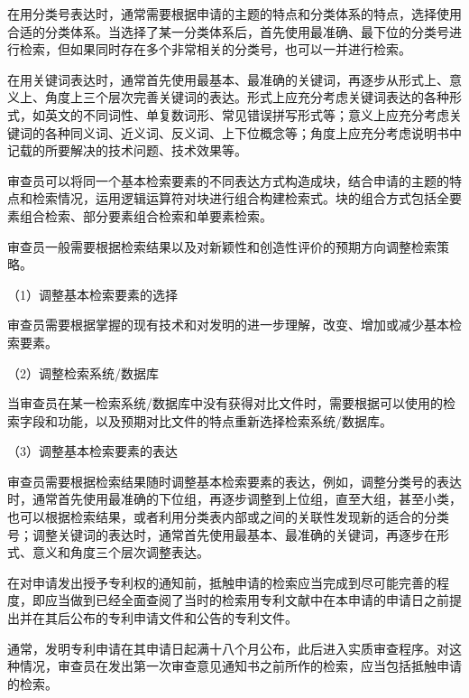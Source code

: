 在用分类号表达时，通常需要根据申请的主题的特点和分类体系的特点，选择使用合适的分类体系。当选择了某一分类体系后，首先使用最准确、最下位的分类号进行检索，但如果同时存在多个非常相关的分类号，也可以一并进行检索。

在用关键词表达时，通常首先使用最基本、最准确的关键词，再逐步从形式上、意义上、角度上三个层次完善关键词的表达。形式上应充分考虑关键词表达的各种形式，如英文的不同词性、单复数词形、常见错误拼写形式等；意义上应充分考虑关键词的各种同义词、近义词、反义词、上下位概念等；角度上应充分考虑说明书中记载的所要解决的技术问题、技术效果等。

审查员可以将同一个基本检索要素的不同表达方式构造成块，结合申请的主题的特点和检索情况，运用逻辑运算符对块进行组合构建检索式。块的组合方式包括全要素组合检索、部分要素组合检索和单要素检索。

审查员一般需要根据检索结果以及对新颖性和创造性评价的预期方向调整检索策略。

{\setlength{\parindent}{17.1bp}（1）调整基本检索要素的选择\par}

审查员需要根据掌握的现有技术和对发明的进一步理解，改变、增加或减少基本检索要素。

{\setlength{\parindent}{17.1bp}（2）调整检索系统/数据库\par}

当审查员在某一检索系统/数据库中没有获得对比文件时，需要根据可以使用的检索字段和功能，以及预期对比文件的特点重新选择检索系统/数据库。

{\setlength{\parindent}{17.1bp}（3）调整基本检索要素的表达\par}

审查员需要根据检索结果随时调整基本检索要素的表达，例如，调整分类号的表达时，通常首先使用最准确的下位组，再逐步调整到上位组，直至大组，甚至小类，也可以根据检索结果，或者利用分类表内部或之间的关联性发现新的适合的分类号；调整关键词的表达时，通常首先使用最基本、最准确的关键词，再逐步在形式、意义和角度三个层次调整表达。

在对申请发出授予专利权的通知前，抵触申请的检索应当完成到尽可能完善的程度，即应当做到已经全面查阅了当时的检索用专利文献中在本申请的申请日之前提出并在其后公布的专利申请文件和公告的专利文件。

通常，发明专利申请在其申请日起满十八个月公布，此后进入实质审查程序。对这种情况，审查员在发出第一次审查意见通知书之前所作的检索，应当包括抵触申请的检索。

